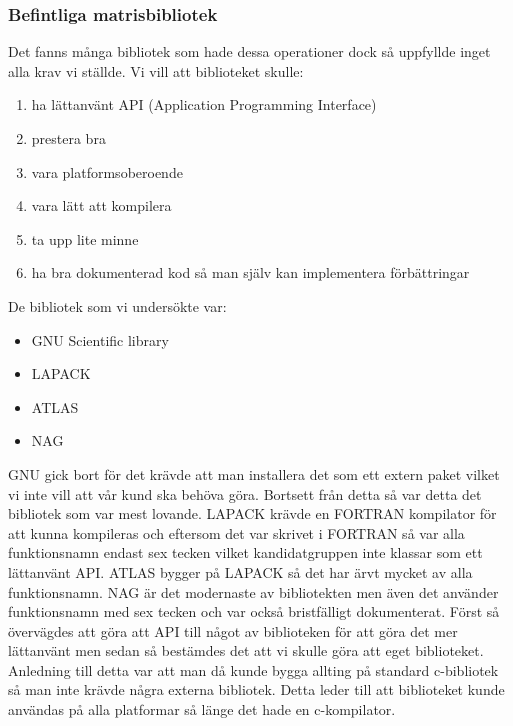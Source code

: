 \subsubsection{Befintliga matrisbibliotek}
Det fanns många bibliotek som hade dessa operationer dock så uppfyllde inget alla krav vi ställde. Vi vill att biblioteket skulle:
\begin{enumerate}
\item ha lättanvänt API (Application Programming Interface)
\item prestera bra
\item vara platformsoberoende
\item vara lätt att kompilera
\item ta upp lite minne
\item ha bra dokumenterad kod så man själv kan implementera förbättringar
\end{enumerate} 
De bibliotek som vi undersökte var:
\begin{itemize}

\item GNU Scientific library
\item LAPACK
\item ATLAS
\item NAG

\end{itemize}
GNU gick bort för det krävde att man installera det som ett extern paket vilket vi inte vill att vår kund ska behöva göra. Bortsett från detta så var detta det bibliotek som var mest lovande. 
LAPACK krävde en FORTRAN kompilator för att kunna kompileras och eftersom det var skrivet i FORTRAN så var alla funktionsnamn endast sex tecken vilket kandidatgruppen inte klassar som ett lättanvänt API.
ATLAS bygger på LAPACK så det har ärvt mycket av alla funktionsnamn.
NAG är det modernaste av bibliotekten men även det använder funktionsnamn med sex tecken och var också bristfälligt dokumenterat.
\newline
\newline
Först så övervägdes att göra att API till något av biblioteken för att göra det mer lättanvänt men sedan så bestämdes det att vi skulle göra att eget biblioteket. Anledning till detta var att man då kunde bygga allting på standard c-bibliotek så man inte krävde några externa bibliotek. Detta leder till att biblioteket kunde användas på alla platformar så länge det hade en c-kompilator. 


